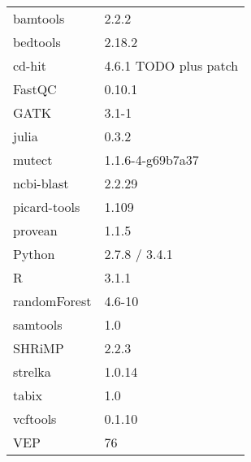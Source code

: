 \documentclass[a4paper]{report}
\begin{document}
\begin{tabular}{ll}
\toprule
  bamtools                    & 2.2.2 \\
  bedtools                    & 2.18.2 \\
  cd-hit                      & 4.6.1 TODO plus patch \\
  FastQC                      & 0.10.1 \\
  GATK                        & 3.1-1 \\
  julia                       & 0.3.2 \\
  mutect                      & 1.1.6-4-g69b7a37 \\
  ncbi-blast                  & 2.2.29 \\
  picard-tools                & 1.109 \\
  provean                     & 1.1.5 \\
  Python                      & 2.7.8 / 3.4.1 \\
  R                           & 3.1.1 \\
  \quad randomForest          & 4.6-10 \\
  samtools                    & 1.0 \\
  SHRiMP                      & 2.2.3 \\
  strelka                     & 1.0.14 \\
  tabix                       & 1.0 \\
  vcftools                    & 0.1.10 \\
  VEP                         & 76 \\
\bottomrule
\end{tabular}









\end{document}
